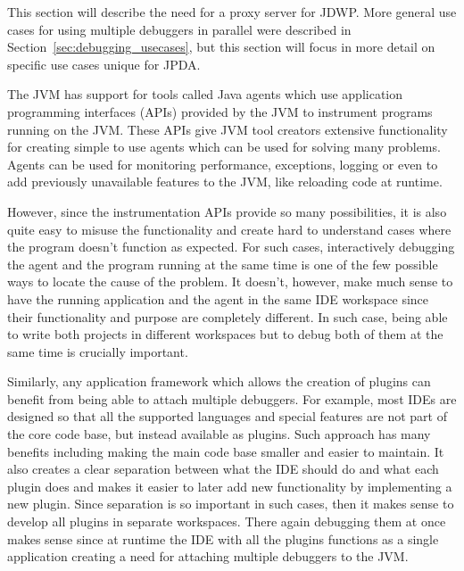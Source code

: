 \documentclass[..thesis.tex]{subfiles}
\begin{document}
This section will describe the need for a proxy server for JDWP.
More general use cases for using multiple debuggers in parallel were described in Section~\ref{sec:debugging_usecases}, 
but this section will focus in more detail on specific use cases unique for JPDA.

The JVM has support for tools called Java agents which use application programming interfaces (APIs) provided by the JVM to instrument programs running on the JVM.
These APIs give JVM tool creators extensive functionality for creating simple to use agents which can be used for solving many problems.
Agents can be used for monitoring performance, exceptions, logging or even to add previously unavailable features to the JVM, like reloading code at runtime.

However, since the instrumentation APIs provide so many possibilities, it is also quite easy to misuse the functionality and create hard to understand cases where the program doesn't function as expected.
For such cases, interactively debugging the agent and the program running at the same time is one of the few possible ways to locate the cause of the problem.
It doesn't, however, make much sense to have the running application and the agent in the same IDE workspace since their functionality and purpose are completely different.
In such case, being able to write both projects in different workspaces but to debug both of them at the same time is crucially important.

Similarly, any application framework which allows the creation of plugins can benefit from being able to attach multiple debuggers.
For example, most IDEs are designed so that all the supported languages and special features are not part of the core code base, but instead available as plugins. 
Such approach has many benefits including making the main code base smaller and easier to maintain.
It also creates a clear separation between what the IDE should do and what each plugin does and makes it easier to later add new functionality by implementing a new plugin.
Since separation is so important in such cases, then it makes sense to develop all plugins in separate workspaces.
There again debugging them at once makes sense since at runtime the IDE with all the plugins functions as a single application creating a need for attaching multiple debuggers to the JVM.
\end{document}
